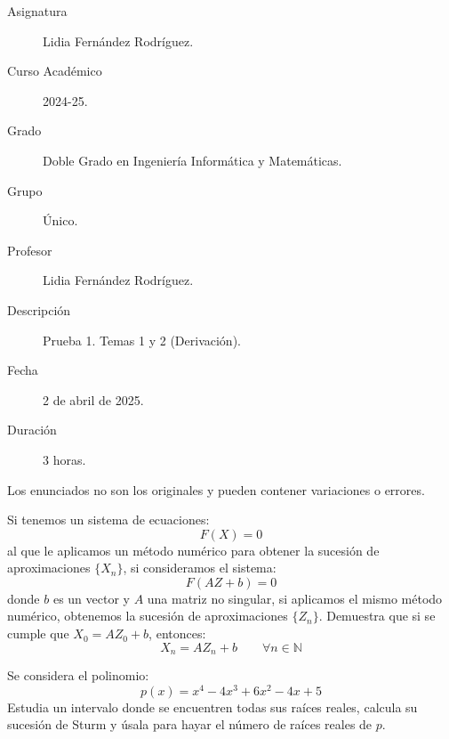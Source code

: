 \documentclass[12pt]{article}
\begin{document}

    
    

    \begin{description}
        \item[Asignatura] Lidia Fernández Rodríguez.
        \item[Curso Académico] 2024-25.
        \item[Grado] Doble Grado en Ingeniería Informática y Matemáticas.
        \item[Grupo] Único.
        \item[Profesor] Lidia Fernández Rodríguez.
        \item[Descripción] Prueba 1. Temas 1 y 2 (Derivación).
        \item[Fecha] 2 de abril de 2025.
        \item[Duración] 3 horas.
    
    \end{description}
    \newpage

    \noindent
    Los enunciados no son los originales y pueden contener variaciones o errores.

    \begin{ejercicio}
        Si tenemos un sistema de ecuaciones:
        \begin{equation*}
            F(X) = 0
        \end{equation*}
        al que le aplicamos un método numérico para obtener la sucesión de aproximaciones $\{X_n\}$, si consideramos el sistema:
        \begin{equation*}
            F(AZ+b) = 0
        \end{equation*}
        donde $b$ es un vector y $A$ una matriz no singular, si aplicamos el mismo método numérico, obtenemos la sucesión de aproximaciones $\{Z_n\}$. Demuestra que si se cumple que $X_0 = AZ_0 + b$, entonces:
        \begin{equation*}
            X_n = AZ_n + b \qquad \forall n\in \mathbb{N}
        \end{equation*}
    \end{ejercicio}

    \begin{ejercicio}
        Se considera el polinomio:
        \begin{equation*}
            p(x) = x^4-4x^3+6x^2-4x+5
        \end{equation*}
        Estudia un intervalo donde se encuentren todas sus raíces reales, calcula su sucesión de Sturm y úsala para hayar el número de raíces reales de $p$.
    \end{ejercicio}
\end{document}

